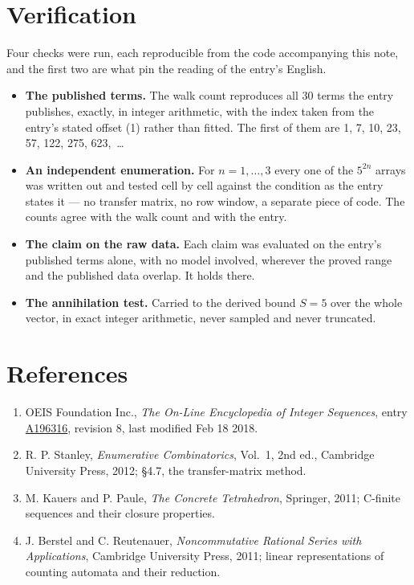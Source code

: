 \documentclass[11pt]{article}
\theoremstyle{definition}
\begin{document}
\section{Verification}

Four checks were run, each reproducible from the code accompanying this note, and the first two are what pin the reading of the entry's English.

\begin{itemize}

\item {\bfseries The published terms.} The walk count reproduces all 30 terms the entry publishes, exactly, in integer arithmetic, with the index taken from the entry's stated offset (1) rather than fitted. The first of them are 1, 7, 10, 23, 57, 122, 275, 623,~\dots

\item {\bfseries An independent enumeration.} For $n = 1,\dots,3$ every one of the $5^{2n}$ arrays was written out and tested cell by cell against the condition as the entry states it --- no transfer matrix, no row window, a separate piece of code. The counts agree with the walk count and with the entry.

\item {\bfseries The claim on the raw data.} Each claim was evaluated on the entry's published terms alone, with no model involved, wherever the proved range and the published data overlap. It holds there.

\item {\bfseries The annihilation test.} Carried to the derived bound $S = 5$ over the whole vector, in exact integer arithmetic, never sampled and never truncated.

\end{itemize}

\section{References}

\begin{enumerate}

\item OEIS Foundation Inc., \emph{The On-Line Encyclopedia of Integer Sequences}, entry \href{https://oeis.org/A196316}{A196316}, revision 8, last modified Feb 18 2018.

\item R. P. Stanley, \emph{Enumerative Combinatorics}, Vol.~1, 2nd ed., Cambridge University Press, 2012; \S4.7, the transfer-matrix method.

\item M. Kauers and P. Paule, \emph{The Concrete Tetrahedron}, Springer, 2011; C-finite sequences and their closure properties.

\item J. Berstel and C. Reutenauer, \emph{Noncommutative Rational Series with Applications}, Cambridge University Press, 2011; linear representations of counting automata and their reduction.

\end{enumerate}
\end{document}
